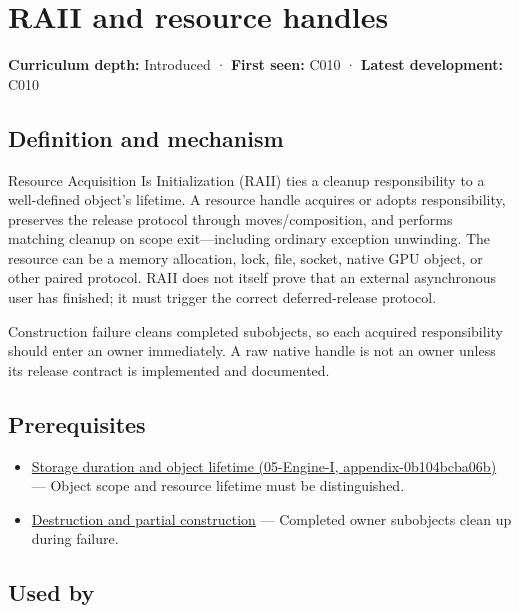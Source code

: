 \hypertarget{appendix-69739d3ab49b}{}
\section{RAII and resource handles}\label{appendix-69739d3ab49b-raii-and-resource-handles}

\textbf{Curriculum depth:} Introduced · \textbf{First seen:} C010 · \textbf{Latest development:} C010

\subsection{Definition and mechanism}\label{appendix-69739d3ab49b-definition-and-mechanism}

Resource Acquisition Is Initialization (RAII) ties a cleanup responsibility to a well-defined object's lifetime. A resource handle acquires or adopts responsibility, preserves the release protocol through moves/composition, and performs matching cleanup on scope exit---including ordinary exception unwinding. The resource can be a memory allocation, lock, file, socket, native GPU object, or other paired protocol. RAII does not itself prove that an external asynchronous user has finished; it must trigger the correct deferred-release protocol.

Construction failure cleans completed subobjects, so each acquired responsibility should enter an owner immediately. A raw native handle is not an owner unless its release contract is implemented and documented.

\subsection{Prerequisites}\label{appendix-69739d3ab49b-prerequisites}

\begin{itemize}
\tightlist
\item
  \href{../05-Engine-I/main.pdf\#nameddest=appendix-0b104bcba06b}{Storage duration and object lifetime (05-Engine-I, appendix-0b104bcba06b)} --- Object scope and resource lifetime must be distinguished.
\item
  \hyperref[appendix-9bfe377cef7a]{Destruction and partial construction} --- Completed owner subobjects clean up during failure.
\end{itemize}

\subsection{Used by}\label{appendix-69739d3ab49b-used-by}

